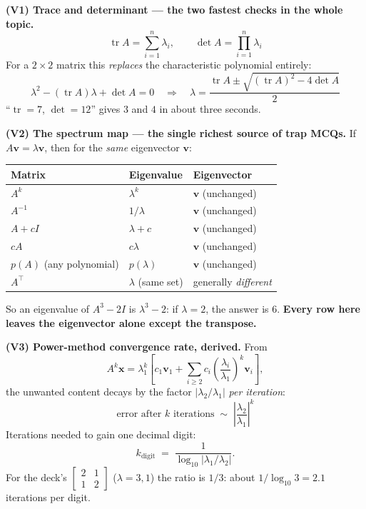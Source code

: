 \begin{derivedbox}
\textbf{(V1) Trace and determinant --- the two fastest checks in the whole topic.}
\[
\boxed{\operatorname{tr}A = \sum_{i=1}^{n}\lambda_i}, \qquad \boxed{\det A = \prod_{i=1}^{n}\lambda_i}
\]
For a $2\times2$ matrix this \emph{replaces} the characteristic polynomial entirely:
\[
\lambda^2 - (\operatorname{tr}A)\lambda + \det A = 0
\quad\Longrightarrow\quad
\lambda = \frac{\operatorname{tr}A \pm \sqrt{(\operatorname{tr}A)^2 - 4\det A}}{2}
\]
``$\operatorname{tr}=7$, $\det=12$'' gives $3$ and $4$ in about three seconds.

\smallskip
\textbf{(V2) The spectrum map --- the single richest source of trap MCQs.}
If $A\mathbf v = \lambda\mathbf v$, then for the \emph{same} eigenvector $\mathbf v$:
\begin{center}\small
\begin{tabular}{@{}lll@{}}
\toprule
Matrix & Eigenvalue & Eigenvector\\
\midrule
$A^k$ & $\lambda^k$ & $\mathbf v$ (unchanged)\\
$A^{-1}$ & $1/\lambda$ & $\mathbf v$ (unchanged)\\
$A + cI$ & $\lambda + c$ & $\mathbf v$ (unchanged)\\
$cA$ & $c\lambda$ & $\mathbf v$ (unchanged)\\
$p(A)$ (any polynomial) & $p(\lambda)$ & $\mathbf v$ (unchanged)\\
$A^{\top}$ & $\lambda$ (same set) & generally \emph{different}\\
\bottomrule
\end{tabular}
\end{center}
So an eigenvalue of $A^3 - 2I$ is $\lambda^3 - 2$: if $\lambda = 2$, the answer is $6$. \textbf{Every row here leaves the eigenvector alone except the transpose.}

\smallskip
\textbf{(V3) Power-method convergence rate, derived.} From
\[
A^k\mathbf x = \lambda_1^k\left[c_1\mathbf v_1 + \sum_{i\ge2}c_i\left(\frac{\lambda_i}{\lambda_1}\right)^{k}\mathbf v_i\right],
\]
the unwanted content decays by the factor $|\lambda_2/\lambda_1|$ \emph{per iteration}:
\[
\boxed{\text{error after } k \text{ iterations} \;\sim\; \left|\frac{\lambda_2}{\lambda_1}\right|^{k}}
\]
Iterations needed to gain one decimal digit:
\[
k_{\text{digit}} \;=\; \frac{1}{\log_{10}\left|\lambda_1/\lambda_2\right|}.
\]
For the deck's $\begin{bmatrix}2&1\\1&2\end{bmatrix}$ ($\lambda = 3,1$) the ratio is $1/3$: about $1/\log_{10}3 = 2.1$ iterations per digit.


\end{derivedbox}
